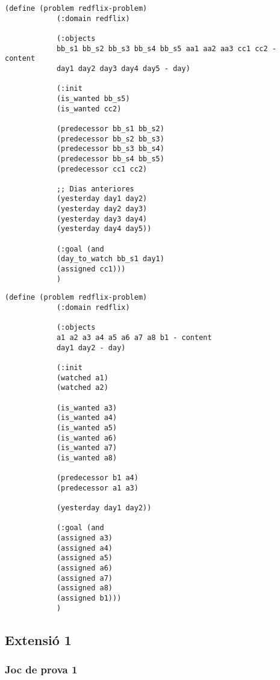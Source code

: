 \documentclass[a4paper]{article}
\begin{document}
	\noindent
	\begin{minipage}[t]{0.45\textwidth}
		\begin{lstlisting}[language=PDDL, caption={Joc de Prova 1 - Nivell Bàsic}, label={lst:JP1B}]                     
			(define (problem redflix-problem)
			(:domain redflix)
			
			(:objects
			bb_s1 bb_s2 bb_s3 bb_s4 bb_s5 aa1 aa2 aa3 cc1 cc2 - content
			day1 day2 day3 day4 day5 - day)
			
			(:init
			(is_wanted bb_s5)
			(is_wanted cc2)
			
			(predecessor bb_s1 bb_s2)
			(predecessor bb_s2 bb_s3)
			(predecessor bb_s3 bb_s4)
			(predecessor bb_s4 bb_s5)
			(predecessor cc1 cc2)
			
			;; Dias anteriores
			(yesterday day1 day2)
			(yesterday day2 day3)
			(yesterday day3 day4)
			(yesterday day4 day5))
			
			(:goal (and
			(day_to_watch bb_s1 day1)
			(assigned cc1)))
			)	
		\end{lstlisting}
		
	\end{minipage}
	\hfill
	\begin{minipage}[t]{0.45\textwidth}
		\begin{lstlisting}[language=PDDL, caption={Joc de Prova 2 - Nivell Bàsic}, label={lst:JP2B}]                     
			(define (problem redflix-problem)
			(:domain redflix)
			
			(:objects
			a1 a2 a3 a4 a5 a6 a7 a8 b1 - content
			day1 day2 - day)
			
			(:init
			(watched a1)
			(watched a2)
			
			(is_wanted a3)
			(is_wanted a4)
			(is_wanted a5)
			(is_wanted a6)
			(is_wanted a7)
			(is_wanted a8)
			
			(predecessor b1 a4)
			(predecessor a1 a3)
			
			(yesterday day1 day2))
			
			(:goal (and
			(assigned a3)
			(assigned a4)
			(assigned a5)
			(assigned a6)
			(assigned a7)   
			(assigned a8)
			(assigned b1)))
			)	
		\end{lstlisting}
	\end{minipage}
	
	
	\subsection{Extensió 1}
	
	
	\subsubsection*{Joc de prova 1}
	
\end{document}
